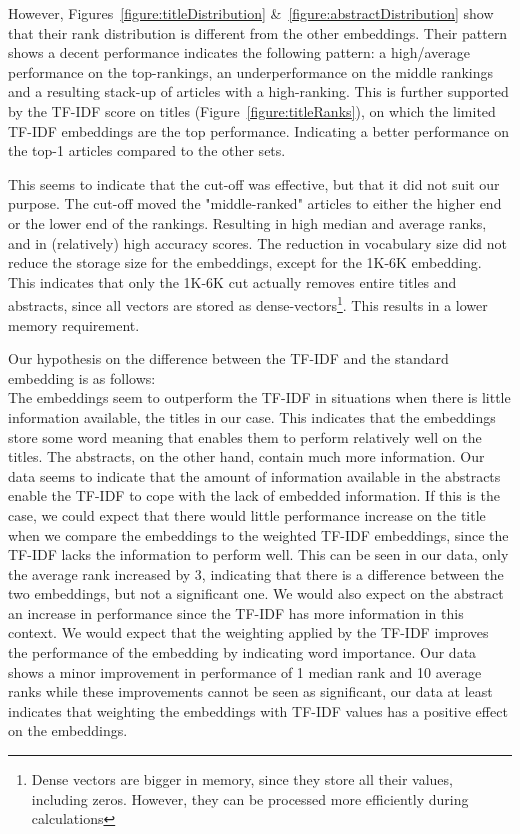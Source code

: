\documentclass[../../Thesis.tex]{subfiles}
\begin{document}
\begin{jumpin}
However, Figures~\ref{figure:titleDistribution} \&~\ref{figure:abstractDistribution} show that their rank distribution is different from the other embeddings. Their pattern shows a decent performance indicates the following pattern: a high/average performance on the top-rankings, an underperformance on the middle rankings and a resulting stack-up of articles with a high-ranking. This is further supported by the TF-IDF score on titles (Figure~\ref{figure:titleRanks}), on which the limited TF-IDF embeddings are the top performance. Indicating a better performance on the top-1 articles compared to the other sets.
\end{jumpin}This seems to indicate that the cut-off was effective, but that it did not suit our purpose. The cut-off moved the "middle-ranked"  articles to either the higher end or the lower end of the rankings. Resulting in high median and average ranks, and in (relatively) high accuracy scores. The reduction in vocabulary size did not reduce the storage size for the embeddings, except for the 1K-6K embedding. This indicates that only the 1K-6K cut actually removes entire titles and abstracts, since all vectors are stored as dense-vectors\footnote{Dense vectors are bigger in memory, since they store all their values, including zeros. However, they can be processed more efficiently during calculations}. This results in a lower memory requirement.

Our hypothesis on the difference between the TF-IDF and the standard embedding is as follows:\\
The embeddings seem to outperform the TF-IDF in situations when there is little information available, the titles in our case. This indicates that the embeddings store some word meaning that enables them to perform relatively well on the titles. The abstracts, on the other hand, contain much more information. Our data seems to indicate that the amount of information available in the abstracts enable the TF-IDF to cope with the lack of embedded information. 
If this is the case, we could expect that there would little performance increase on the title when we compare the embeddings to the weighted TF-IDF embeddings, since the TF-IDF lacks the information to perform well. This can be seen in our data, only the average rank increased by 3, indicating that there is a difference between the two embeddings, but not a significant one. We would also expect on the abstract an increase in performance since the TF-IDF has more information in this context. We would expect that the weighting applied by the TF-IDF improves the performance of the embedding by indicating word importance. Our data shows a minor improvement in performance of 1 median rank and 10 average ranks while these improvements cannot be seen as significant, our data at least indicates that weighting the embeddings with TF-IDF values has a positive effect on the embeddings.
\end{document}
